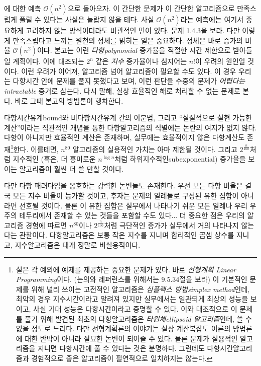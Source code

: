 \documentclass[a4paper,chapter,atbegshi,]{oblivoir}
\begin{document}
에 대한 예측  $\mathcal{O}(n^2)$으로 돌아오자. 
이 간단한 문제가 이 간단한 알고리즘으로 만족스럽게 풀릴 수 있다는 사실은 놀랍지
않을 테다. 사실 $\mathcal{O}(n^2)$라는 예측에는 여기서 중요하게 고려하지 않는 
방식이더라도 비관적인 면이 있다. 문제 1.4.3을 보라.
다만 이렇게 만족스럽다고 느끼는 원천의 정체를 밝히는 일은 중요하다.
정체은 바로 증가의 비율 $\mathcal{O}(n^2)$이다. 
본고는 이런 \emph{다항\footnotesize polynomial} 증가율을 적절한 시간
제한으로 받아들일 계획이다. 이에 대조되는 $2^n$ 같은 \emph{지수} 증가율이나
심지어는 $n!$이 우려의 원인일 것이다. 이런 우려가 이어져, 알고리즘
넘어 알고리즘이 필요할 수도 있다. 이 경우 우리는 다항시간 안에 문제를 풀지
못했다고 보며, 이런 판단을 수중의 문제가 \emph{어렵다는\footnotesize intractable}
증거로 삼는다. 다시 말해, 실상 효율적인 해로 처리할 수 없는 문제로 본다.
바로 그때 본고의 방법론이 행차한다.  

다항시간유계{\footnotesize bound}와 비다항시간유계 간의 이분법, 그리고 
``실질적으로 실현 가능한 계산''이라는 직관적인 개념을 통한 다항알고리즘의
식별에는 논란의 여지가 없지 않다. 다항이 아니지만 효율적인 계산은 존재하며, 
실무에는 효율적이지 않은 다항계산도 존재\footnote[2]{실은 각 예외에 
예제를 제공하는 중요한 문제가 있다. 바로 \emph{선형계획\footnotesize
Linear Programming}이다. (논의와 레퍼런스를 위해서는 9.5.34절을 보라) 
이 기본적인 문제를 위해 널리 쓰이는 고전적인 알고리즘은 \emph{심플렉스
방법\footnotesize simplex method}인데, 최악의 경우 지수시간이라고
알려져 있지만 실무에서는 일관되게 최상의 성능을 보이고, 사실 기대 성능은
다항시간이라고 증명할 수 있다. 이와 대조적으로 이 문제를 풀기 위해 발견된
최초의 다항알고리즘은 \emph{타원체{\footnotesize}ellipsoid 알고리즘}인데,
쓸 수 없을 정도로 느리다. 다만 선형계획론의 이야기는 실상 계산복잡도 이론의
방법론에 대한 반박이 아니라 절묘한 논변이 되어줄 수 있다. 물론 문제가 실용적인 
알고리즘을 지니면 다항시간에 풀 수 있다는 것은 분명하다. 그런데도
다항시간알고리즘과 경험적으로 좋은 알고리즘이 필연적으로 일치하지는 않는다.}한다.
이를테면, $n^{80}$ 알고리즘의 실용적인 가치는 아마 제한될 것이다. 그리고 
$2^{\frac{n}{100}}$처럼 지수적인 (혹은, 더 흥미로운 $n^{\log 
n}$처럼 하위지수적인{\footnotesize subexponential}) 증가율을 보이는 알고리즘이
훨씬 더 쓸 만할 것이다.

다만 다항 패러다임을 옹호하는 강력한 논변들도 존재한다. 우선 모든 
다항 비율은 결국 모든 지수 비율이 능가할 것이고, 후자는 문제의 일례들로 구성된
유한 집합이 아니라면 선호될 것이다. 물론 이 유한 집합은 실무에서 나타나기
쉬운 모든 일례나 우리 우주의 테두리에서 존재할 수 있는 것들을 포함할 수도 있다...
더 중요한 점은 우리의 알고리즘 경험에 따르면 $n^{80}$이나
$2^{\frac{n}{100}}$처럼 극단적인 증가가 실무에서 거의 나타나지 않는다는 관찰이다.
다항알고리즘은 보통 작은 지수를 지니며 합리적인 곱셈 상수를 지니고, 
지수알고리즘은 대개 정말로 비실용적이다. 
\end{document}

